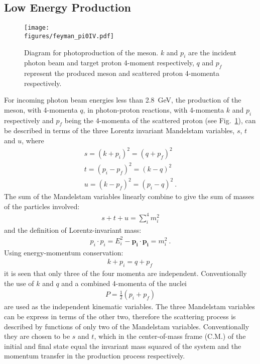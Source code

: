 \subsection{Low Energy \piz Production}\label{sec:into:xsection.low}

\begin{figure}[h!]\begin{center}
\texttt{[image: \\figures/feyman\_pi0IV.pdf]}
\caption[Diagram for photoproduction of the \piz meson]{\label{fig:xsection.pi0feynman}	Diagram for photoproduction of the \piz meson. $k$ and $p_i$ are the incident photon beam and target proton 4-moment respectively, $q$ and $p_f$ represent the produced \piz meson and scattered proton 4-momenta respectively.}
\end{center}\end{figure}
For incoming photon beam energies less than 2.8~GeV, the production of the \piz meson, with 4-momenta $q$, in photon-proton reactions, with 4-momenta $k$ and $p_i$ respectively and $p_f$ being the 4-momenta of the scattered proton (see Fig.~\ref{fig:xsection.pi0feynman}),  can be described in terms of the three Lorentz invariant Mandelstam variables, $s$, $t$ and $u$, where
\begin{align}
s = (k+p_i)^2 = (q+p_f)^2 \nonumber \\
t=(p_i-p_f)^2 = (k-q)^2  \nonumber \\
u = (k - p_f)^2 = (p_i-q)^2 \ .
\end{align}
The sum of the Mandelstam variables linearly combine to give the sum of masses of the particles involved:
\begin{align}
s + t + u = \sum\limits_{i}^{4} m_i^2 
\end{align}
and the definition of Lorentz-invariant mass:
\begin{align}
p_i\cdot p_i = E_i^2 - \mathbf{p_i}\cdot \mathbf{p_i} = m_i^2 \ .
\end{align}
Using energy-momentum conservation:
\begin{align}
k + p_i = q+p_f \,
\end{align}
it is seen that only three of the four momenta are independent. Conventionally the use of $k$ and $q$ and a combined 4-momenta of the nuclei 
\begin{align}
P = \frac{1}{2}(p_i+p_f)
\end{align}
are used as the independent kinematic variables. The three Mandelstam variables can be express in terms of the other two, therefore the scattering process is described by functions of only two of the Mandelstam variables. Conventionally they are chosen to be $s$ and $t$, which in the center-of-mass frame (C.M.) of the initial and final state equal the invariant mass squared of the system and the momentum transfer in the production process respectively.
